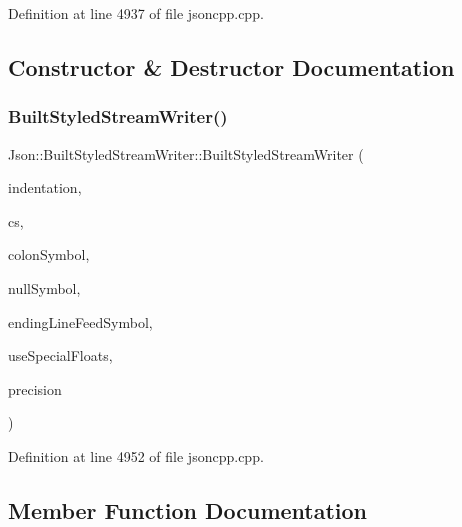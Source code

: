 Definition at line 4937 of file jsoncpp.\+cpp.



\subsection{Constructor \& Destructor Documentation}
\hypertarget{struct_json_1_1_built_styled_stream_writer_adf11b7d1ee3c68d096b7c662ee85948e}{}\label{struct_json_1_1_built_styled_stream_writer_adf11b7d1ee3c68d096b7c662ee85948e} 
\subsubsection{\texorpdfstring{Built\+Styled\+Stream\+Writer()}{BuiltStyledStreamWriter()}}
{\footnotesize\ttfamily Json\+::\+Built\+Styled\+Stream\+Writer\+::\+Built\+Styled\+Stream\+Writer (\begin{DoxyParamCaption}\item[{\hyperlink{config_8h_a1e723f95759de062585bc4a8fd3fa4be}{J\+S\+O\+N\+C\+P\+P\+\_\+\+S\+T\+R\+I\+NG} const \&}]{indentation,  }\item[{\hyperlink{struct_json_1_1_comment_style_a51fc08f3518fd81eba12f340d19a3d0c}{Comment\+Style\+::\+Enum}}]{cs,  }\item[{\hyperlink{config_8h_a1e723f95759de062585bc4a8fd3fa4be}{J\+S\+O\+N\+C\+P\+P\+\_\+\+S\+T\+R\+I\+NG} const \&}]{colon\+Symbol,  }\item[{\hyperlink{config_8h_a1e723f95759de062585bc4a8fd3fa4be}{J\+S\+O\+N\+C\+P\+P\+\_\+\+S\+T\+R\+I\+NG} const \&}]{null\+Symbol,  }\item[{\hyperlink{config_8h_a1e723f95759de062585bc4a8fd3fa4be}{J\+S\+O\+N\+C\+P\+P\+\_\+\+S\+T\+R\+I\+NG} const \&}]{ending\+Line\+Feed\+Symbol,  }\item[{bool}]{use\+Special\+Floats,  }\item[{unsigned int}]{precision }\end{DoxyParamCaption})}



Definition at line 4952 of file jsoncpp.\+cpp.



\subsection{Member Function Documentation}
\hypertarget{struct_json_1_1_built_styled_stream_writer_a457c2f3c1e8c952caeb60e52477d0c9a}{}\label{struct_json_1_1_built_styled_stream_writer_a457c2f3c1e8c952caeb60e52477d0c9a} 
